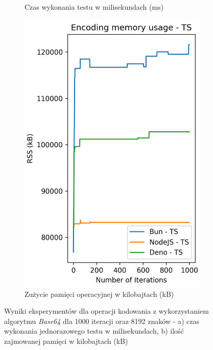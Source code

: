 \begin{figure}[H]
\begin{subfigure}[b]{0.42\textwidth}
    \caption{Czas wykonania testu w milisekundach (ms)}
    \label{fig:encoding_e2_ts_time}
  \end{subfigure}
  \begin{subfigure}[b]{0.42\textwidth}
    \centering
    \includegraphics[width=\textwidth]{Figures/coding/base64_1000_encoding_ts_memory.png}
    \caption{Zużycie pamięci operacyjnej w kilobajtach (kB)}
    \label{fig:encoding_e2_ts_memory}
  \end{subfigure}
  \hfill
  \caption{Wyniki eksperymentów dla operacji kodowania z wykorzystaniem algorytmu \textit{Base64} dla 1000 iteracji oraz 8192 znaków - a) czas wykonania jednorazowego testu w milisekundach, b) ilość zajmowanej pamięci w kilobajtach (kB)}
  \label{fig:encoding_e2_ts}
\end{figure}

